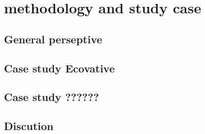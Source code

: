 \chapter{methodology and study case}




\section{General perseptive}




\section{Case study Ecovative}




\section{Case study ??????}






\section{Discution}


